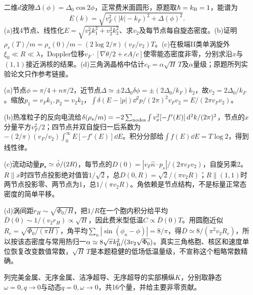 \begin{exercise}[原题1(a)--(d)]
二维$d$波隙$\Delta(\phi)=\Delta_0\cos2\phi$，正常费米面圆形，原题取$\hbar=k_{\mathrm B}=1$，能谱为
\begin{equation}
E(k)=\sqrt{v_F^2(|k|-k_F)^2+\Delta(\phi)^2}.
\end{equation}
(a)找4节点、线性化$E=\sqrt{v_F^2k_1^2+v_2^2k_2^2}$、求$v_2$及每节点每自旋态密度。(b)证明$\rho_s(T)/m=\rho_s(0)/m-(2\log2/\pi)(v_F/v_2)T$。(c)在极端II类单涡旋外$\xi_0\ll R\ll\lambda$，Doppler位移$v_F\cdot[\nabla\theta/2+eA/c]$使零能态密度非零，分别求沿$x$与$(1,1)$接近涡核的结果。(d)三角涡晶格中估计$c_V=\alpha\sqrt H\,T$及$\alpha$量级；原题所列实验论文只作参考链接。
\end{exercise}
\begin{solution}
(a)节点$\phi=\pi/4+n\pi/2$，近节点$\Delta\simeq\pm2\Delta_0\delta\phi=\pm(2\Delta_0/k_F)k_2$，故$v_2=2\Delta_0/k_F$。缩放$p_1=v_Fk_1,p_2=v_2k_2$，$\int\delta(E-|p|)\dd^2p/(2\pi)^2v_Fv_2=E/(2\pi v_Fv_2)$。

(b)热准粒子的反向电流给$\delta(\rho_s/m)=-2\sum_{\rm nodes}\int v_x^2[-f'(E)]\,\mathrm d^2k/(2\pi)^2$，节点的$x$分量平方$v_F^2/2$；四节点并双自旋归一后系数为$-(2/\pi)(v_F/v_2)\int_0^\infty E[-f'(E)]\dd E$。积分分部给$\int f(E)\dd E=T\log2$，得到线性律。

(c)流动动量$\boldsymbol{p}_s\simeq\hat\phi/(2R)$，每节点的$D(0)=|v_F\hat n\cdot p_s|/(2\pi v_Fv_2)$，自旋另乘2。$R\parallel x$时四节点投影绝对值皆$1/\sqrt2$，总$D(0,R)=\sqrt2/(\pi v_2R)$；$R\parallel(1,1)$时两节点投影零、两节点为1，总$1/(\pi v_2R)$。角依赖是节点结构，不是标量正常态密度的简单平移。

(d)涡间距$r_H\sim\sqrt{\Phi_0/H}$，把$1/R$在一个胞内积分给平均$\overline D(0)\sim1/(v_2r_H)\propto\sqrt H$，因此费米型低温$C\propto\overline D(0)T$。用圆胞近似$R_c=\sqrt{\Phi_0/(\pi H)}$，角平均$\overline{\sum_n|\sin(\phi_n-\phi)|}=8/\pi$，得$\overline D\simeq8/(\pi^2v_2R_c)$，所以按该态密度与常用热归一$\alpha\simeq8\sqrt\pi k_{\mathrm B}^2/(3v_2\sqrt{\Phi_0})$。真实三角格胞、核区和速度单位恢复改变数值常数，$\sqrt H\,T$是本题稳健的低场低温量级，不宣称这个粗略常数精确。
\end{solution}
\begin{exercise}[原题2]
列完美金属、无序金属、洁净超导、无序超导的实部横纵$K$，分别取静态$\omega=0,q\to0$与动态$q=0,\omega\to0$，共16个量，并给主要非零贡献。
\end{exercise}
